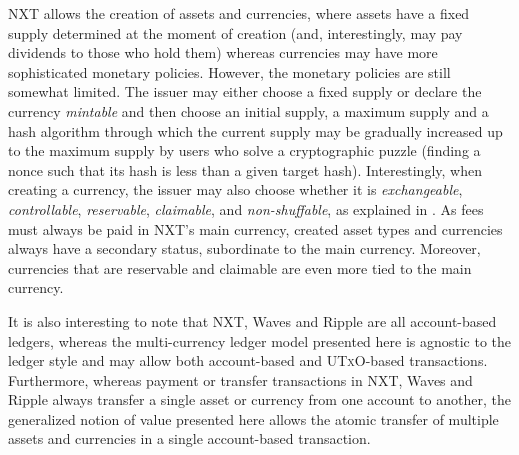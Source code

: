 \documentclass{llncs}
\newcommand{\utxo}{\textsc{UTxO}\xspace}
\begin{document}
NXT allows the creation of assets and currencies, where assets have a fixed supply determined at the moment of creation (and, interestingly, may pay dividends to those who hold them) whereas currencies may have more sophisticated monetary policies. However, the monetary policies are still somewhat limited. The issuer may either choose a fixed supply or declare the currency \emph{mintable} and then choose an initial supply, a maximum supply and a hash algorithm through which the current supply may be gradually increased up to the maximum supply by users who solve a cryptographic puzzle (finding a nonce such that its hash is less than a given target hash). Interestingly, when creating a currency, the issuer may also choose whether it is \emph{exchangeable}, \emph{controllable}, \emph{reservable}, \emph{claimable}, and \emph{non-shuffable}, as explained in \cite{NXTCurrencyProperties}. As fees must always be paid in NXT's main currency, created asset types and currencies always have a secondary status, subordinate to the main currency. Moreover, currencies that are reservable and claimable are even more tied to the main currency.

It is also interesting to note that NXT, Waves and Ripple are all account-based ledgers, whereas the multi-currency ledger model presented here is agnostic to the ledger style and may allow both account-based and \utxo-based transactions. Furthermore, whereas payment or transfer transactions in NXT, Waves and Ripple always transfer a single asset or currency from one account to another, the generalized notion of value presented here allows the atomic transfer of multiple assets and currencies in a single account-based transaction.
\end{document}

